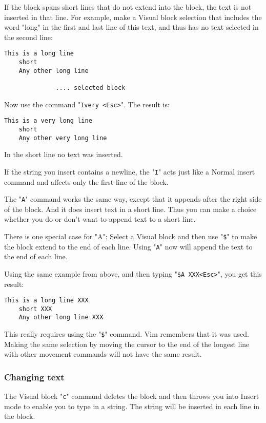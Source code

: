 If the block spans short lines that do not extend into the block, the text is not inserted in that line.
For example, make a Visual block selection that includes the word "long" in the first and last line of this text, and thus has no text selected in the second line:

\begin{Verbatim}[samepage=true]
    This is a long line 
    short 
    Any other long line 

              .... selected block
\end{Verbatim}

Now use the command "\texttt{Ivery <Esc>}".
The result is:

\begin{Verbatim}[samepage=true]
    This is a very long line 
    short 
    Any other very long line 
\end{Verbatim}

In the short line no text was inserted.

If the string you insert contains a newline, the "\texttt{I}" acts just like a Normal insert command and affects only the first line of the block.

The "\texttt{A}" command works the same way, except that it appends after the right side of the block.
And it does insert text in a short line.
Thus you can make a choice whether you do or don't want to append text to a short line.

There is one special case for "A": Select a Visual block and then use "\texttt{\$}" to make the block extend to the end of each line.
Using "\texttt{A}" now will append the text to the end of each line.

Using the same example from above, and then typing "\texttt{\$A XXX<Esc>}", you get this result:

\begin{Verbatim}[samepage=true]
    This is a long line XXX 
    short XXX 
    Any other long line XXX 
\end{Verbatim}

This really requires using the "\texttt{\$}" command.
Vim remembers that it was used.
Making the same selection by moving the cursor to the end of the longest line with other movement commands will not have the same result.
\subsubsection{Changing text}
The Visual block "\texttt{c}" command deletes the block and then throws you into Insert mode to enable you to type in a string.
The string will be inserted in each line in the block.

